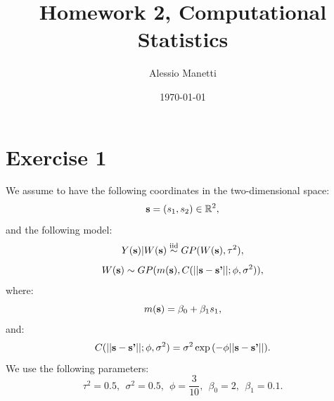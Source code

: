 \documentclass[a4paper,12pt]{article}
\title{Homework 2, Computational Statistics}
\author{Alessio Manetti}
\date{\today}  %
\begin{document}
\maketitle
\tableofcontents  %

\newpage

\section{Exercise 1}
We assume to have the following coordinates in the two-dimensional space:
\begin{equation*}
    \text{\textbf{s}} = (s_1, s_2) \in \mathbb{R}^2,
\end{equation*}
and the following model:
\begin{equation*}
    Y(\text{\textbf{s}})|W(\text{\textbf{s}}) \overset{\text{iid}}{\sim} GP(W(\text{\textbf{s}}), \tau^2),
\end{equation*}
\begin{equation*}
     W(\text{\textbf{s}}) \sim GP(m(\text{\textbf{s}}), C(||\text{\textbf{s}} - \text{\textbf{s'}}||; \phi, \sigma^2 )),
\end{equation*}
where:
\begin{equation*}
    m(\text{\textbf{s}}) = \beta_0 + \beta_1 s_1,
\end{equation*}
and:
\begin{equation*}
    C(||\text{\textbf{s}} - \text{\textbf{s'}}||; \phi, \sigma^2 ) = \sigma^2 \exp{(-\phi ||\text{\textbf{s}} - \text{\textbf{s'}}||)}.
\end{equation*}
We use the following parameters:
\begin{equation*}
    \tau^2 = 0.5, \ \ \sigma^2 = 0.5, \ \ \phi = \frac{3}{10}, \ \ \beta_0 = 2, \ \ \beta_1 = 0.1.
\end{equation*}
\end{document}
